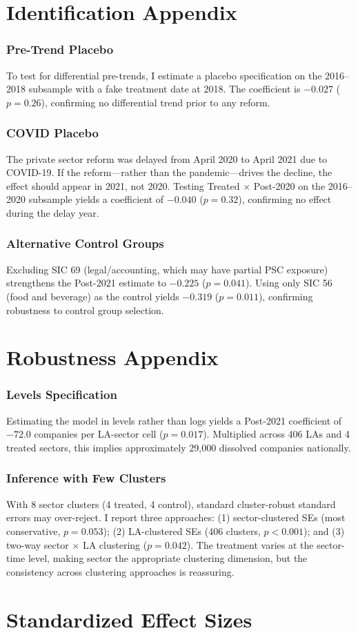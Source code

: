 \documentclass[12pt]{article}
\begin{document}
\section{Identification Appendix}

\subsubsection*{Pre-Trend Placebo} To test for differential pre-trends, I estimate a placebo specification on the 2016--2018 subsample with a fake treatment date at 2018. The coefficient is $-0.027$ ($p = 0.26$), confirming no differential trend prior to any reform.

\subsubsection*{COVID Placebo} The private sector reform was delayed from April 2020 to April 2021 due to COVID-19. If the reform---rather than the pandemic---drives the decline, the effect should appear in 2021, not 2020. Testing Treated $\times$ Post-2020 on the 2016--2020 subsample yields a coefficient of $-0.040$ ($p = 0.32$), confirming no effect during the delay year.

\subsubsection*{Alternative Control Groups} Excluding SIC 69 (legal/accounting, which may have partial PSC exposure) strengthens the Post-2021 estimate to $-0.225$ ($p = 0.041$). Using only SIC 56 (food and beverage) as the control yields $-0.319$ ($p = 0.011$), confirming robustness to control group selection.

\section{Robustness Appendix}

\subsubsection*{Levels Specification} Estimating the model in levels rather than logs yields a Post-2021 coefficient of $-72.0$ companies per LA-sector cell ($p = 0.017$). Multiplied across 406 LAs and 4 treated sectors, this implies approximately 29,000 dissolved companies nationally.

\subsubsection*{Inference with Few Clusters} With 8 sector clusters (4 treated, 4 control), standard cluster-robust standard errors may over-reject. I report three approaches: (1) sector-clustered SEs (most conservative, $p = 0.053$); (2) LA-clustered SEs (406 clusters, $p < 0.001$); and (3) two-way sector $\times$ LA clustering ($p = 0.042$). The treatment varies at the sector-time level, making sector the appropriate clustering dimension, but the consistency across clustering approaches is reassuring.

\section{Standardized Effect Sizes}
\label{sec:sde}


\end{document}
